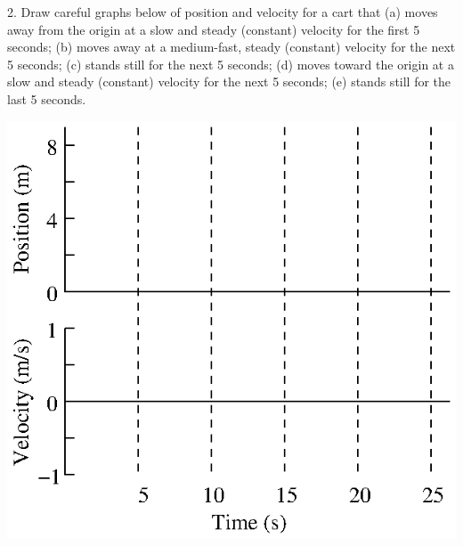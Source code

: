 2. Draw careful graphs below of position and velocity for a cart that (a) moves
away from the origin at a slow and steady (constant) velocity for the first
5 seconds; (b) moves away at a medium-fast, steady (constant) velocity for the
next 5 seconds; (c) stands still for the next 5 seconds; (d) moves toward the
origin at a slow and steady (constant) velocity for the next 5 seconds; (e)
stands still for the last 5 seconds.

\vspace{0.3cm}
{\par\centering \includegraphics{relating_fig6.eps} \par}
\vspace{0.3cm}


